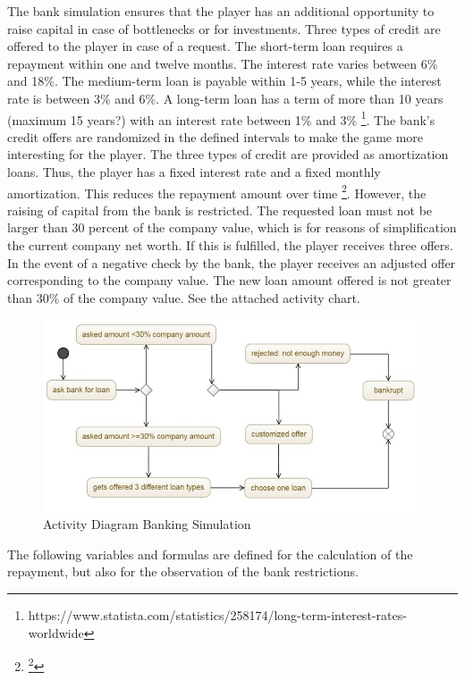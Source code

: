 The bank simulation ensures that the player has an additional opportunity to raise capital in case of bottlenecks or for investments. Three types of credit are offered to the player in case of a request. 
The short-term loan requires a repayment within one and twelve months. The interest rate varies between 6\% and 18\%. The medium-term loan is payable within 1-5 years, while the interest rate is between 3\% and 6\%. A long-term loan has a term of more than 10 years (maximum 15 years?) with an interest rate between 1\% and 3\% \footnote{https://www.statista.com/statistics/258174/long-term-interest-rates-worldwide}. The bank's credit offers are randomized in the defined intervals to make the game more interesting for the player. The three types of credit are provided as amortization loans. Thus, the player has a fixed interest rate and a fixed monthly amortization. This reduces the repayment amount over time \footnote{\footnote{https://www.investopedia.com/terms/a/amortized\_loan.asp}}.
However, the raising of capital from the bank is restricted.
The requested loan must not be larger than 30 percent of the company value, which is for reasons of simplification the current company net worth. If this is fulfilled, the player receives three offers. In the event of a negative check by the bank, the player receives an adjusted offer corresponding to the company value. The new loan amount offered is not greater than 30\% of the company value. See the attached activity chart. 

\begin{figure}
	\centering
	\includegraphics[width=12cm]{images/banking_activity_diagram.jpg}
	\caption{Activity Diagram Banking Simulation}
	\label{jpg:banking}
\end{figure}

The following variables and formulas are defined for the calculation of the repayment, but also for the observation of the bank restrictions.


